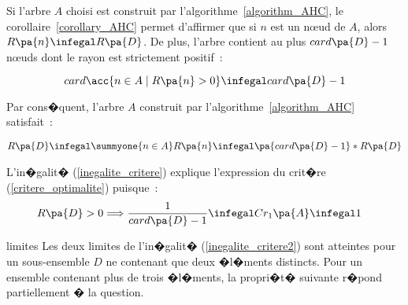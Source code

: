 Si l'arbre $A$ choisi est construit par l'algorithme~\ref{algorithm_AHC}, le corollaire~\ref{corollary_AHC} permet d'affirmer que si $n$ est un n\oe ud de $A$, alors $R\pa{n} \infegal R\pa{D}$. De plus, l'arbre contient au plus $card\pa{D}-1$ n\oe uds dont le rayon est strictement positif~:

    $$
    card  \acc{n \in A \; | \; R \pa{n} > 0} \infegal card\pa{D}-1
    $$

Par cons�quent, l'arbre $A$ construit par l'algorithme~\ref{algorithm_AHC} satisfait~:

    \begin{eqnarray}
    R\pa{D} \infegal    \summyone{n \in A} R\pa{n} \infegal \pa{card\pa{D}-1} * R\pa{D}
                     \label{inegalite_critere}
    \end{eqnarray}

L'in�galit� (\ref{inegalite_critere}) explique l'expression du crit�re (\ref{critere_optimalite}) puisque~:
    \begin{eqnarray}
    R\pa{D} > 0 \Longrightarrow \dfrac{1}{card\pa{D}-1} \infegal    Cr_1\pa{A} \infegal 1  &&
             \label{inegalite_critere2}
    \end{eqnarray}

\begin{xremark}{limites}
Les deux limites de l'in�galit� (\ref{inegalite_critere2}) sont atteintes pour un sous-ensemble $D$ ne contenant que deux �l�ments distincts. Pour un ensemble contenant plus de trois �l�ments, la propri�t� suivante r�pond partiellement � la question.
\end{xremark}





